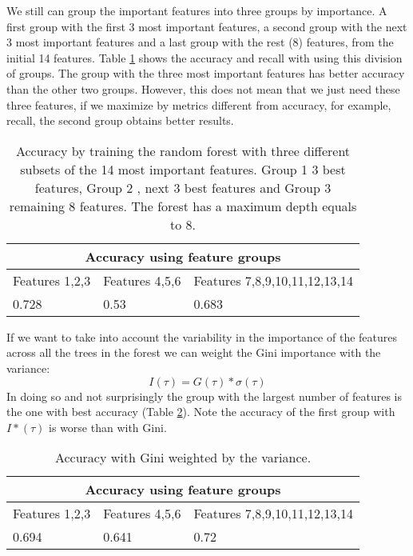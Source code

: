 \documentclass[preprint,12pt]{elsarticle}
\begin{document}
We still can group the important features into three groups by importance. A first group with the first 3 most important features, a second group with the next 3 most important features and a last group with the rest (8) features, from the initial 14 features. Table \ref{fig:treeg} shows the accuracy and recall with using this division of groups. 
The group with the three most important features has better accuracy than the other two groups. However, this does not mean that we just need these three features, if we maximize by metrics different from accuracy, for example, recall, the second group obtains better results.


\begin{table}
\caption{Accuracy by training the random forest with three different subsets of the 14 most important features. Group 1 3 best features, Group 2 , next 3 best features and Group 3 remaining 8 features. The forest has a maximum depth equals to 8.}
\label{fig:treeg}
\begin{center}
\begin{tabular}{ |p{4cm}|p{4cm}|p{4cm}|  }

 \hline
 \multicolumn{3}{|c|}{Accuracy using feature groups} \\
 \hline
 Features 1,2,3    & Features 4,5,6 & Features 7,8,9,10,11,12,13,14\\
 \hline
 0.728   & 0.53    &0.683\\
 \hline
\end{tabular}
\end{center}
\end{table}

If we want to take into account the variability in the importance of the features across all the trees in the forest we can weight the Gini importance with the variance: 
\begin{equation}
I(\tau) = G(\tau) * \sigma(\tau)
\end{equation}
In doing so and not surprisingly the group with the largest number of features is the one with best accuracy (Table \ref{fig:rfvar}). Note the accuracy of the first group with $I*(\tau)$ is worse than with Gini.

\begin{table}
\caption{Accuracy with Gini weighted by the variance.}
\label{fig:rfvar}
\begin{center}
\begin{tabular}{ |p{4cm}|p{4cm}|p{4cm}|  }
 \hline
 \multicolumn{3}{|c|}{Accuracy using feature groups} \\
 \hline
 Features 1,2,3    & Features 4,5,6 & Features 7,8,9,10,11,12,13,14\\
 \hline
0.694   & 0.641    &0.72\\
 \hline
\end{tabular}
\end{center}
\end{table}




\end{document}
